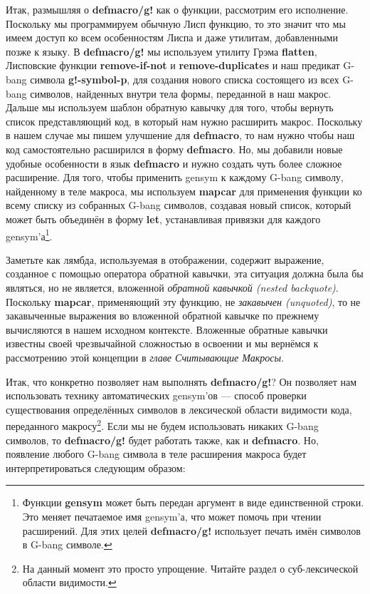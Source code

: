 Итак, размышляя о \textbf{defmacro/g!} как о функции, рассмотрим его исполнение. Поскольку мы программируем обычную Лисп функцию, то это значит что мы имеем доступ ко всем особенностям Лиспа и даже утилитам, добавленными позже к языку. В \textbf{defmacro/g!} мы используем утилиту Грэма \textbf{flatten}, Лисповские функции \textbf{remove-if-not} и \textbf{remove-duplicates} и наш предикат G-bang символа \textbf{g!-symbol-p}, для создания нового списка состоящего из всех G-bang символов, найденных внутри тела формы, переданной в наш макрос. Дальше мы используем шаблон обратную кавычку для того, чтобы вернуть список представляющий код, в который нам нужно расширить макрос. Поскольку в нашем случае мы пишем улучшение для \textbf{defmacro}, то нам нужно чтобы наш код самостоятельно расширился в форму \textbf{defmacro}. Но, мы добавили новые удобные особенности в язык \textbf{defmacro} и нужно создать чуть более сложное расширение. Для того, чтобы применить gensym к каждому G-bang символу, найденному в теле макроса, мы используем \textbf{mapcar} для применения функции ко всему списку из собранных G-bang символов, создавая новый список, который может быть объединён в форму \textbf{let}, устанавливая привязки для каждого gensym'а\footnote{Функции \textbf{gensym} может быть передан аргумент в виде единственной строки. Это меняет печатаемое имя gensym'а, что может помочь при чтении расширений. Для этих целей \textbf{defmacro/g!} использует печать имён символов в G-bang символе.}.

Заметьте как лямбда, используемая в отображении, содержит выражение, созданное с помощью оператора обратной кавычки, эта ситуация должна была бы являться, но не является, вложенной \emph{обратной кавычкой (nested backquote)}. Поскольку \textbf{mapcar}, применяющий эту функцию, не \emph{закавычен (unquoted)}, то не закавыченные выражения во вложенной обратной кавычке по прежнему вычисляются в нашем исходном контексте. Вложенные обратные кавычки известны своей чрезвычайной сложностью в освоении и мы вернёмся к рассмотрению этой концепции в \emph{главе Считывающие Макросы}.

Итак, что конкретно позволяет нам выполнять \textbf{defmacro/g!}? Он позволяет нам использовать технику автоматических gensym'ов --- способ проверки существования определённых символов в лексической области видимости кода, переданного макросу\footnote{На данный момент это просто упрощение. Читайте раздел о суб-лексической области видимости.}. Если мы не будем использовать никаких G-bang символов, то \textbf{defmacro/g!} будет работать также, как и \textbf{defmacro}. Но, появление любого G-bang символа в теле расширения макроса будет интерпретироваться следующим образом:

